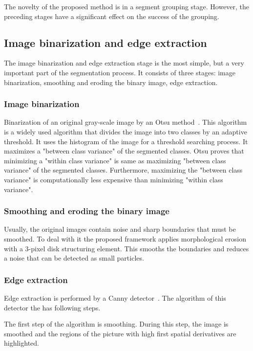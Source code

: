 \documentclass{lutmscthesis}[2010/09/22]
\begin{document}
The novelty of the proposed method is in a segment grouping stage. However, the preceding stages have a significant effect on the success of the grouping. 


\subsection{Image binarization and edge extraction}

The image binarization and edge extraction stage is the most simple, but a very important part of the segmentation process. It consists of three stages: image binarization, smoothing and eroding the binary image, edge extraction.

\subsubsection{Image binarization}

Binarization of an original gray-scale image by an Otsu method~\cite{otsu}. This algorithm is a widely used algorithm that divides the image into two classes by an adaptive threshold. It uses the histogram of the image for a threshold searching process. It maximizes a "between class variance" of the segmented classes. Otsu proves that minimizing a "within class variance" is same as maximizing "between class variance" of the segmented classes. Furthermore, maximizing the "between class variance" is computationally less expensive than minimizing "within class variance".
   
\subsubsection{Smoothing and eroding the binary image}

Usually, the original images contain noise and sharp boundaries that must be smoothed. To deal with it the proposed framework applies morphological erosion~\cite{UECS} with a 3-pixel disk structuring element. This smooths the boundaries and reduces a noise that can be detected as small particles.
 
\subsubsection{Edge extraction}

Edge extraction is performed by a Canny detector~\cite{Canny}. The algorithm of this detector the has following steps.

The first step of the algorithm is smoothing. During this step, the image is smoothed and the regions of the picture with high first spatial derivatives are highlighted.
\end{document}
